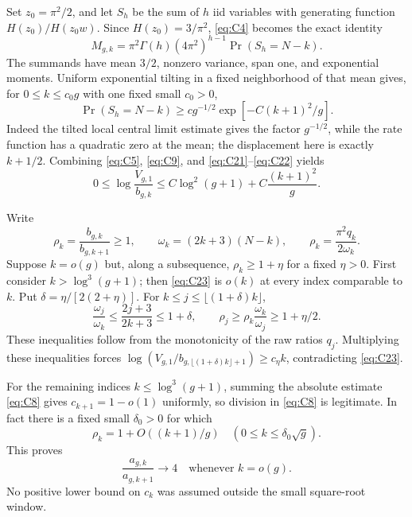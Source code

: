 Set \(z_0=\pi^2/2\), and let \(S_h\) be the sum of \(h\) iid variables
with generating function \(H(z_0)/H(z_0w)\). Since \(H(z_0)=3/\pi^2\),
\eqref{eq:C4} becomes the exact identity \begin{equation}
M_{g,k}=\pi^2\Gamma(h)(4\pi^2)^{h-1}
                     \Pr(S_h=N-k).
 \label{eq:C21}
\end{equation} The summands have mean \(3/2\), nonzero variance, span one, and
exponential moments. Uniform exponential tilting in a fixed neighborhood
of that mean gives, for \(0\le k\le c_0g\) with one fixed small
\(c_0>0\), \begin{equation}
\Pr(S_h=N-k)\ge c g^{-1/2}
            \exp[-C(k+1)^2/g].
 \label{eq:C22}
\end{equation} Indeed the tilted local central limit estimate gives the factor
\(g^{-1/2}\), while the rate function has a quadratic zero at the mean;
the displacement here is exactly \(k+1/2\). Combining \eqref{eq:C5}, \eqref{eq:C9}, and
\eqref{eq:C21}--\eqref{eq:C22} yields \begin{equation}
0\le\log\frac{V_{g,1}}{b_{g,k}}
 \le C\log^2(g+1)+C\frac{(k+1)^2}{g}.
 \label{eq:C23}
\end{equation}

Write \[
 \rho_k=\frac{b_{g,k}}{b_{g,k+1}}\ge1,
 \qquad \omega_k=(2k+3)(N-k),
 \qquad \rho_k=\frac{\pi^2q_k}{2\omega_k}.
\] Suppose \(k=o(g)\) but, along a subsequence, \(\rho_k\ge1+\eta\) for
a fixed \(\eta>0\). First consider \(k>\log^3(g+1)\); then \eqref{eq:C23} is
\(o(k)\) at every index comparable to \(k\). Put
\(\delta=\eta/[2(2+\eta)]\). For \(k\le j\le\lfloor(1+\delta)k\rfloor\),
\begin{equation}
\frac{\omega_j}{\omega_k}\le\frac{2j+3}{2k+3}\le1+\delta,
 \qquad
 \rho_j\ge\rho_k\frac{\omega_k}{\omega_j}
            \ge1+\eta/2.
 \label{eq:C24}
\end{equation} These inequalities follow from the monotonicity of the raw ratios $q_j$.
Multiplying these inequalities forces
\(\log(V_{g,1}/b_{g,\lfloor(1+\delta)k\rfloor+1})\ge c_\eta k\),
contradicting \eqref{eq:C23}.

For the remaining indices \(k\le\log^3(g+1)\), summing the absolute
estimate \eqref{eq:C8} gives \(c_{k+1}=1-o(1)\) uniformly, so division in \eqref{eq:C8} is
legitimate. In fact there is a fixed small \(\delta_0>0\) for which \begin{equation}
\rho_k=1+O((k+1)/g)
       \quad(0\le k\le\delta_0\sqrt g).
 \label{eq:C25}
\end{equation} This proves \begin{equation}
\frac{a_{g,k}}{a_{g,k+1}}\longrightarrow4
                  \quad\text{whenever }k=o(g).
 \label{eq:C26}
\end{equation} No positive lower bound on \(c_k\) was assumed outside the small
square-root window.

